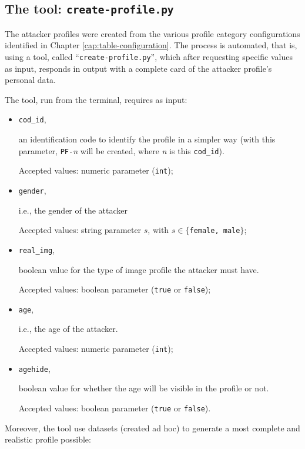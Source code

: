 \subsection{The tool: \texttt{create-profile.py}}
\label{cap:tool-create}
The attacker profiles were created from the various profile category configurations identified in Chapter \ref{cap:table-configuration}. The process is automated, that is, using a tool, called ``\texttt{create-profile.py}'', which after requesting specific values as input, responds in output with a complete card of the attacker profile's personal data.
\par \noindent The tool, run from the terminal, requires as input:
\begin{itemize}
	\item \texttt{cod\_id},\par \noindent an identification code to identify the profile in a simpler way (with this parameter, \texttt{PF-}\textit{n} will be created, where \textit{n} is this \texttt{cod\_id}).\par \noindent Accepted values: numeric parameter (\texttt{int});
	
	\item \texttt{gender},\par \noindent i.e., the gender of the attacker\par \noindent Accepted values: string parameter $s$, with $s \in \{$\texttt{female, male}$\}$;
	
	\item \texttt{real\_img},\par \noindent boolean value for the type of image profile the attacker must have.\par \noindent Accepted values: boolean parameter (\texttt{true} or \texttt{false});
	
	\item \texttt{age},\par \noindent i.e., the age of the attacker.\par \noindent Accepted values: numeric parameter (\texttt{int});
	
	\item \texttt{agehide},\par \noindent boolean value for whether the age will be visible in the profile or not.\par \noindent Accepted values: boolean parameter (\texttt{true} or \texttt{false}).
\end{itemize}
\par \noindent  Moreover, the tool use datasets (created ad hoc) to generate a most complete and realistic profile possible:
